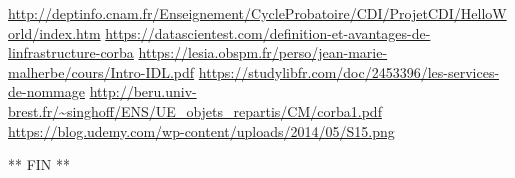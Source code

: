 \begin{thebibliography}{10}
     \url{http://deptinfo.cnam.fr/Enseignement/CycleProbatoire/CDI/ProjetCDI/HelloWorld/index.htm} 
     \url{https://datascientest.com/definition-et-avantages-de-linfrastructure-corba}
     \url{https://lesia.obspm.fr/perso/jean-marie-malherbe/cours/Intro-IDL.pdf}
     \url{https://studylibfr.com/doc/2453396/les-services-de-nommage}
     \url{http://beru.univ-brest.fr/~singhoff/ENS/UE_objets_repartis/CM/corba1.pdf}
     \url{https://blog.udemy.com/wp-content/uploads/2014/05/S15.png}
\end{thebibliography}

\vspace*{7cm}
\begin{center}
   \Huge{** FIN **}
\end{center}